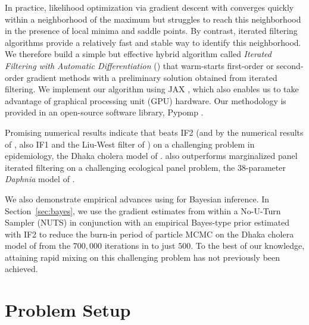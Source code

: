 In practice, likelihood optimization via gradient descent with  converges quickly within a neighborhood of the maximum but struggles to reach this neighborhood in the presence of local minima and saddle points.
By contrast, iterated filtering algorithms provide a relatively fast and stable way to identify this neighborhood.
We therefore build a simple but effective hybrid algorithm called {\it Iterated Filtering with Automatic Differentiation} () that warm-starts first-order or second-order gradient methods with a preliminary solution obtained from iterated filtering.
We implement our algorithm using JAX \citep{jax}, which also enables us to take advantage of graphical processing unit (GPU) hardware.
Our methodology is provided in an open-source software library, Pypomp \citep{abkemeier25}.

Promising numerical results indicate that  beats IF2 (and by the numerical results of \citet{ionides15}, also IF1 and the Liu-West filter of \citet{liuwest01}) on a challenging problem in epidemiology, the Dhaka cholera model of \cite{king08}.
 also outperforms marginalized panel iterated filtering on a challenging ecological panel problem, the 38-parameter \textit{Daphnia} model of \citet{yang25daphnia}.
\newEdit{\editClaim}
\newEdit{\editPlugAndPlay}

We also demonstrate empirical advances using  for Bayesian inference.
In Section~\ref{sec:bayes}, we use the gradient estimates from  within a No-U-Turn Sampler (NUTS) \citep{hoffman14} in conjunction with an empirical Bayes-type prior estimated with IF2 to reduce the burn-in period of particle MCMC \citep{andrieu10} on the Dhaka cholera model of \cite{king08} from the $700,000$ iterations in \cite{fasiolo16} to just $500$.
To the best of our knowledge, attaining rapid mixing on this challenging problem has not previously been achieved. 

\section{Problem Setup}

